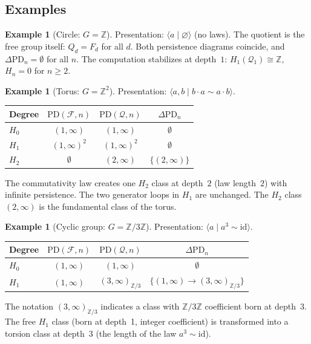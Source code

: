 \documentclass{article}
\theoremstyle{definition}
\newtheorem{example}[theorem]{Example}
\theoremstyle{remark}
\newcommand{\id}{\mathrm{id}}
\begin{document}
\subsection{Examples}

\begin{example}[Circle: $G = \mathbb{Z}$]
\label{ex:pers_circle}
Presentation: $\langle a \mid \varnothing \rangle$ (no laws).
The quotient is the free group itself: $Q_d = F_d$ for all $d$.
Both persistence diagrams coincide, and $\Delta\mathrm{PD}_n = \emptyset$
for all $n$. The computation stabilizes at depth~$1$:
$H_1(\mathcal{Q}_1) \cong \mathbb{Z}$, $H_n = 0$ for $n \geq 2$.
\end{example}

\begin{example}[Torus: $G = \mathbb{Z}^2$]
\label{ex:pers_torus}
Presentation: $\langle a, b \mid b \cdot a \sim a \cdot b \rangle$.

\medskip
\begin{center}
\begin{tabular}{lccc}
\hline
Degree & $\mathrm{PD}(\mathcal{F},n)$ & $\mathrm{PD}(\mathcal{Q},n)$
       & $\Delta\mathrm{PD}_n$ \\
\hline
$H_0$ & $(1, \infty)$ & $(1, \infty)$ & $\emptyset$ \\
$H_1$ & $(1,\infty)^2$ & $(1,\infty)^2$ & $\emptyset$ \\
$H_2$ & $\emptyset$ & $(2, \infty)$ & $\{(2,\infty)\}$ \\
\hline
\end{tabular}
\end{center}

\medskip
\noindent
The commutativity law creates one $H_2$ class at depth~$2$ (law
length~$2$) with infinite persistence. The two generator loops
in $H_1$ are unchanged. The $H_2$ class $(2, \infty)$ is the
fundamental class of the torus.
\end{example}

\begin{example}[Cyclic group: $G = \mathbb{Z}/3\mathbb{Z}$]
\label{ex:pers_z3}
Presentation: $\langle a \mid a^3 \sim \id \rangle$.

\medskip
\begin{center}
\begin{tabular}{lccc}
\hline
Degree & $\mathrm{PD}(\mathcal{F},n)$ & $\mathrm{PD}(\mathcal{Q},n)$
       & $\Delta\mathrm{PD}_n$ \\
\hline
$H_0$ & $(1, \infty)$ & $(1, \infty)$ & $\emptyset$ \\
$H_1$ & $(1,\infty)$ & $(3, \infty)_{\mathbb{Z}/3}$ & $\{(1,\infty)\to(3,\infty)_{\mathbb{Z}/3}\}$ \\
\hline
\end{tabular}
\end{center}

\medskip
\noindent
The notation $(3, \infty)_{\mathbb{Z}/3}$ indicates a class with
$\mathbb{Z}/3\mathbb{Z}$ coefficient born at depth~$3$. The free
$H_1$ class (born at depth~1, integer coefficient) is transformed
into a torsion class at depth~$3$ (the length of the law $a^3 \sim \id$).
\end{example}
\end{document}
